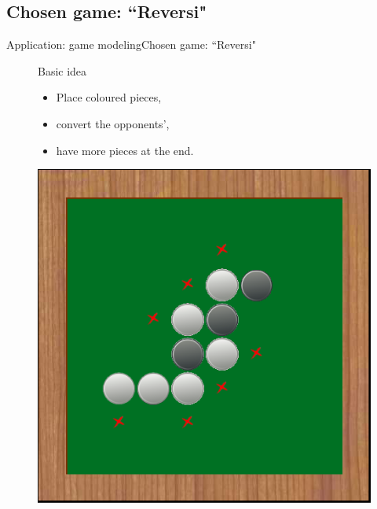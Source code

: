 \subsection{Chosen game: ``Reversi"}
\begin{frame}{Application: game modeling}{Chosen game: ``Reversi"}

\begin{figure}[ht]
\begin{minipage}[t]{0.5\linewidth}
\vspace{0pt}
\begin{block}{Basic idea}
\begin{itemize} 
\item Place coloured pieces,
\item convert the opponents',
\item have more pieces at the end.
\end{itemize}
\end{block}
\end{minipage}
\hfill
\begin{minipage}[t]{0.4\linewidth}
\vspace{0pt}
\centering
\includegraphics[width=\textwidth]{img/application/reversi.png}
\end{minipage}
\end{figure}

\end{frame}

